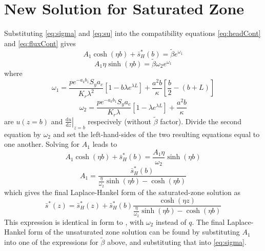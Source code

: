\documentclass[11pt]{article}
\begin{document}
\section{New Solution for Saturated Zone}
Substituting \eqref{eq:sigma} and \eqref{eq:su} into the compatibility
equations \eqref{eq:headCont} and \eqref{eq:fluxCont} gives
$$  A_1 \cosh(\eta b) + \bar{s}_H^{\ast}(b) = \tilde{\beta}e^{\omega_1}$$
$$ A_1 \eta  \sinh(\eta b)  = \tilde{\beta} \omega_2 e^{\omega_1}$$
where 
$$ \omega_1 = \frac{p e^{-a_k b_1} S_y a_c} {K_r \lambda^2} \left[ 1  - b\lambda e^{\lambda L} \right] + \frac{a^2 b}{\kappa}\left[\frac{b}{2} - \left( b+L\right) \right]$$
\begin{equation}
  \label{eq:omega2}
  \omega_2 = \frac{p e^{-a_k b_1} S_y a_c} {K_r \lambda}\left[ 1  - \lambda e^{\lambda L} \right] + \frac{a^2 b}{\kappa}
\end{equation}
are $u(z=b)$ and $\left. \frac{\mathrm{d} u}{\mathrm{d}z} \right|_{z=b}$
respecively (without $\tilde\beta$ factor).
Divide the second equation by $\omega_2$ and set the left-hand-sides of the two resulting equations equal to one another.  Solving for $A_1$ leads to
$$A_1 \cosh(\eta b) + \bar{s}_H^{\ast}(b) = \frac{A_1  \eta}{\omega_2}  \sinh(\eta b) $$
$$ A_1 = \frac{\bar{s}_H^{\ast}(b)}{\frac{\eta}{\omega_2}  \sinh(\eta b) - \cosh(\eta b)}$$
which gives the final Laplace-Hankel form of the saturated-zone solution as
$$ \bar{s}^{\ast}(z)  = \bar{s}_H^{\ast}(z) + \bar{s}_H^{\ast}(b) \frac{\cosh(\eta z)}{\frac{\eta}{\omega_2}  \sinh(\eta b) - \cosh(\eta b)}$$ 
This expression is identical in form to \cite[eqn.\ C17]{mishra10},
with $\omega_2$ instead of $q$.  The final Laplace-Hankel form of the unsaturated zone solution can be found by substituting $A_1$ into one of the expressions for $\tilde\beta$ above, and substituting that into \eqref{eq:sigma}.


\end{document}
